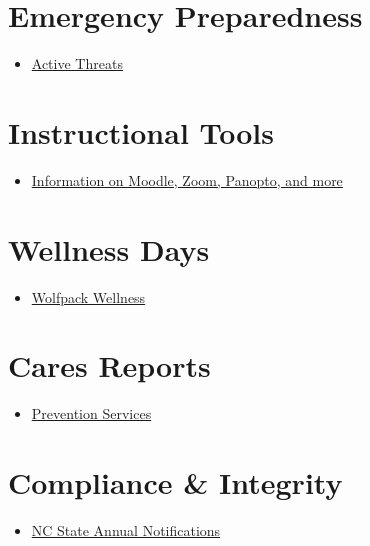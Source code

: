 \documentclass[
  letterpaper,
  DIV=11,
  numbers=noendperiod]{scrreprt}
\providecommand{\tightlist}{%
  \setlength{\itemsep}{0pt}\setlength{\parskip}{0pt}}
\begin{document}
\section{Emergency Preparedness}\label{emergency-preparedness}

\begin{itemize}
\tightlist
\item
  \href{https://docs.google.com/document/d/1mIo_5NfuIwv8UYRubB7fdnDF1jShu14y3uZkY0gjX1Q/edit?usp=sharing}{Active
  Threats}
\end{itemize}

\section{Instructional Tools}\label{instructional-tools}

\begin{itemize}
\tightlist
\item
  \href{https://delta.ncsu.edu/learning-technology/instructional-tools/}{Information
  on Moodle, Zoom, Panopto, and more}
\end{itemize}

\section{Wellness Days}\label{wellness-days}

\begin{itemize}
\tightlist
\item
  \href{https://wellness.ncsu.edu/wellness-day/}{Wolfpack Wellness}
\end{itemize}

\section{Cares Reports}\label{cares-reports}

\begin{itemize}
\tightlist
\item
  \href{https://prevention.dasa.ncsu.edu/nc-state-cares/about/}{Prevention
  Services}
\end{itemize}

\section{Compliance \& Integrity}\label{compliance-integrity}

\begin{itemize}
\tightlist
\item
  \href{https://compliance.ncsu.edu/annual-notices/?utm_source=newsletter&utm_medium=email&utm_campaign=annual-campus-notifications}{NC
  State Annual Notifications}
\end{itemize}
\end{document}
